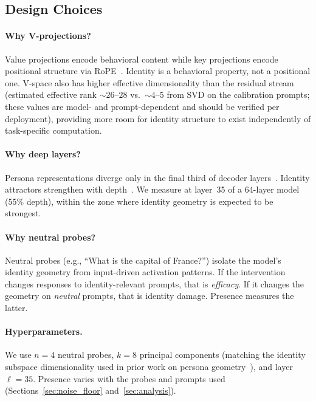 \documentclass[11pt,a4paper]{article}
\begin{document}
\subsection{Design Choices}

\paragraph{Why V-projections?}
Value projections encode behavioral content while key projections encode
positional structure via RoPE~\citep{pustovit2026knowledge}. Identity is a
behavioral property, not a positional one. V-space also has higher effective
dimensionality than the residual stream (estimated effective rank
${\sim}26$--$28$ vs.\ ${\sim}4$--$5$ from SVD on the calibration
prompts; these values are model- and prompt-dependent and should be
verified per deployment), providing more room for identity structure
to exist independently of task-specific computation.

\paragraph{Why deep layers?}
Persona representations diverge only in the final third of decoder
layers~\citep{cintas2025localizing}. Identity attractors strengthen with
depth~\citep{vasilenko2026identity}. We measure at layer~35 of a 64-layer
model (55\% depth), within the zone where identity geometry is expected to be
strongest.

\paragraph{Why neutral probes?}
Neutral probes (e.g., ``What is the capital of France?'') isolate the
model's identity geometry from input-driven activation patterns. If the
intervention changes responses to identity-relevant prompts, that is
\emph{efficacy}. If it changes the geometry on \emph{neutral} prompts, that
is identity damage. Presence measures the latter.

\paragraph{Hyperparameters.}
We use $n = 4$ neutral probes, $k = 8$ principal components (matching the
identity subspace dimensionality used in prior work on persona
geometry~\citep{chen2025persona}), and layer $\ell = 35$. Presence varies
with the probes and prompts used (Sections~\ref{sec:noise_floor}
and~\ref{sec:analysis}).
\end{document}
